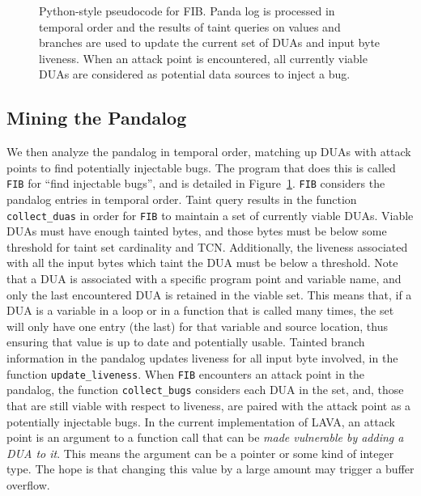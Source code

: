 \begin{figure}

\caption{Python-style pseudocode for FIB. 
Panda log is processed in temporal order and the results of taint queries on values and branches are 
used to update the current set of DUAs and input byte liveness.
When an attack point is encountered, all currently viable DUAs are considered as potential data sources to inject a bug.}
\label{alg:fib}
\end{figure}

\subsection{Mining the Pandalog}
\label{sec:mining}
We then analyze the pandalog in temporal order, matching up DUAs with attack points to find potentially injectable bugs.
The program that does this is called \verb+FIB+ for ``find injectable bugs'', and is detailed in Figure~\ref{alg:fib}.
\verb+FIB+ considers the pandalog entries in temporal order.
Taint query results in the function \verb+collect_duas+ in order for \verb+FIB+ to maintain a set of currently viable DUAs.
Viable DUAs must have enough tainted bytes, and those bytes must be below some threshold for taint set cardinality and TCN.
Additionally, the liveness associated with all the input bytes which taint the DUA must be below a threshold.
Note that a DUA is associated with a specific program point and variable name, and only the last encountered DUA is retained in the viable set. 
This means that, if a DUA is a variable in a loop or in a function that is called many times, the set will only have one entry (the last) for that variable and source location, thus ensuring that value is up to date and potentially usable.  
Tainted branch information in the pandalog updates liveness for all input byte involved, in the function \verb+update_liveness+.
When \verb+FIB+ encounters an attack point in the pandalog, the function \verb+collect_bugs+ considers each DUA in the set,
and, those that are still viable with respect to liveness, are paired with the attack point as a potentially injectable bugs.
In the current implementation of LAVA, an attack point is an argument to a function call that can be \emph{made vulnerable by adding a DUA to it}.
This means the argument can be a pointer or some kind of integer type. 
The hope is that changing this value by a large amount may trigger a buffer overflow. 

